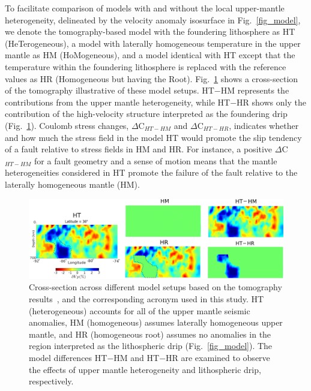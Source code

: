 \documentclass[draft,linenumbers]{agujournal2018}
\begin{document}
To facilitate comparison of models with and without the local upper-mantle heterogeneity, delineated by the velocity anomaly isosurface in Fig.~\ref{fig_model}, we denote the tomography-based model with the foundering lithosphere as HT (HeTerogeneous), a model with laterally homogeneous temperature in the upper mantle as HM (HoMogeneous), and a model identical with HT except that the temperature within the foundering lithosphere is replaced with the reference values as HR (Homogeneous but having the Root). Fig.~\ref{model_differences} shows a cross-section of the tomography illustrative of these model setups. HT$-$HM represents the contributions from the upper mantle heterogeneity, while HT$-$HR shows only the contribution of the high-velocity structure interpreted as the foundering drip (Fig.~\ref{model_differences}).  Coulomb stress changes, $\Delta$C$_{HT-HM}$ and $\Delta$C$_{HT-HR}$, indicates whether and how much the stress field in the model HT would promote the slip tendency of a fault relative to stress fields in HM and HR. For instance, a positive $\Delta$C$_{HT-HM}$ for a fault geometry and a sense of motion means that the mantle heterogeneities considered in HT promote the failure of the fault relative to the laterally homogeneous mantle (HM). 
%
\begin{figure}[h!]
    \centering
    \includegraphics[width=\linewidth]{figures/model_differences.png}
    \caption{Cross-section across different model setups based on the tomography results~\citep{Biryol_2016}, and the corresponding acronym used in this study. HT (heterogeneous) accounts for all of the upper mantle seismic anomalies, HM (homogeneous) assumes laterally homogeneous upper mantle, and HR (homogeneous root) assumes no anomalies in the region interpreted as the lithospheric drip (Fig.~\ref{fig_model}). The model differences HT$-$HM and HT$-$HR are examined to observe the effects of upper mantle heterogeneity and lithospheric drip, respectively. }
    \label{model_differences}
\end{figure}
\end{document}
